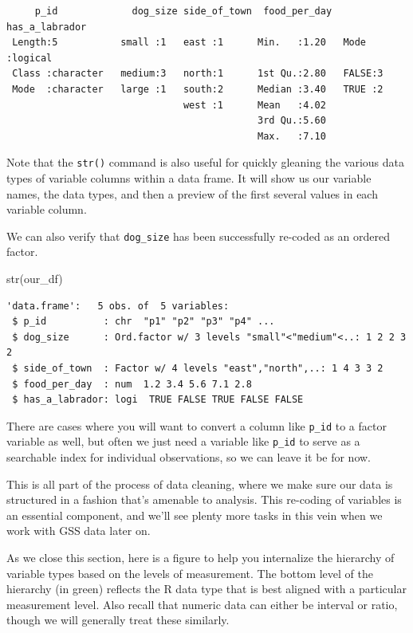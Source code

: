 \documentclass[
  letterpaper,
  DIV=11,
  numbers=noendperiod]{scrreprt}
\newenvironment{Shaded}{\begin{snugshade}}{\end{snugshade}}
\newcommand{\FunctionTok}[1]{\textcolor[rgb]{0.28,0.35,0.67}{#1}}
\newcommand{\NormalTok}[1]{\textcolor[rgb]{0.00,0.23,0.31}{#1}}
\begin{document}
\begin{verbatim}
     p_id             dog_size side_of_town  food_per_day  has_a_labrador 
 Length:5           small :1   east :1      Min.   :1.20   Mode :logical  
 Class :character   medium:3   north:1      1st Qu.:2.80   FALSE:3        
 Mode  :character   large :1   south:2      Median :3.40   TRUE :2        
                               west :1      Mean   :4.02                  
                                            3rd Qu.:5.60                  
                                            Max.   :7.10                  
\end{verbatim}

Note that the \texttt{str()} command is also useful for quickly gleaning
the various data types of variable columns within a data frame. It will
show us our variable names, the data types, and then a preview of the
first several values in each variable column.

We can also verify that \texttt{dog\_size} has been successfully
re-coded as an ordered factor.

\begin{Shaded}
\begin{Highlighting}[]
\FunctionTok{str}\NormalTok{(our\_df)}
\end{Highlighting}
\end{Shaded}

\begin{verbatim}
'data.frame':   5 obs. of  5 variables:
 $ p_id          : chr  "p1" "p2" "p3" "p4" ...
 $ dog_size      : Ord.factor w/ 3 levels "small"<"medium"<..: 1 2 2 3 2
 $ side_of_town  : Factor w/ 4 levels "east","north",..: 1 4 3 3 2
 $ food_per_day  : num  1.2 3.4 5.6 7.1 2.8
 $ has_a_labrador: logi  TRUE FALSE TRUE FALSE FALSE
\end{verbatim}

There are cases where you will want to convert a column like
\texttt{p\_id} to a factor variable as well, but often we just need a
variable like \texttt{p\_id} to serve as a searchable index for
individual observations, so we can leave it be for now.

This is all part of the process of data cleaning, where we make sure our
data is structured in a fashion that's amenable to analysis. This
re-coding of variables is an essential component, and we'll see plenty
more tasks in this vein when we work with GSS data later on.

As we close this section, here is a figure to help you internalize the
hierarchy of variable types based on the levels of measurement. The
bottom level of the hierarchy (in green) reflects the R data type that
is best aligned with a particular measurement level. Also recall that
numeric data can either be interval or ratio, though we will generally
treat these similarly.
\end{document}
